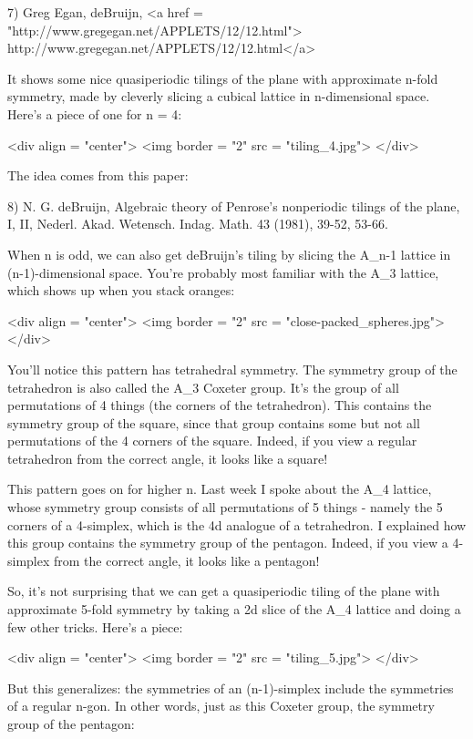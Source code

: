 7) Greg Egan, deBruijn, 
<a href = "http://www.gregegan.net/APPLETS/12/12.html">
http://www.gregegan.net/APPLETS/12/12.html</a>

It shows some nice quasiperiodic tilings of the plane with approximate 
n-fold symmetry, made by cleverly slicing a cubical lattice in 
n-dimensional space.   Here's a piece of one for n = 4:

<div align = "center">
<img border = "2" src = "tiling_4.jpg">
</div>
 
The idea comes from this paper:

8) N. G. deBruijn, Algebraic theory of Penrose's nonperiodic tilings 
of the plane, I, II, Nederl. Akad. Wetensch. Indag. Math. 43 (1981),
39-52, 53-66. 

When n is odd, we can also get deBruijn's tiling by slicing the
A_{n-1} lattice in (n-1)-dimensional space.  You're probably
most familiar with the A_{3} lattice, which shows up when you
stack oranges:

<div align = "center">
<img border = "2" src = "close-packed_spheres.jpg">
</div>

You'll notice this pattern has tetrahedral symmetry.  The symmetry
group of the tetrahedron is also called the A_{3} Coxeter
group.  It's the group of all permutations of 4 things (the corners of
the tetrahedron).  This contains the symmetry group of the square,
since that group contains some but not all permutations of the 4
corners of the square.  Indeed, if you view a regular tetrahedron from
the correct angle, it looks like a square!

This pattern goes on for higher n.  Last week I spoke about the
A_{4} lattice, whose symmetry group consists of all
permutations of 5 things - namely the 5 corners of a 4-simplex, which
is the 4d analogue of a tetrahedron.  I explained how this group
contains the symmetry group of the pentagon.  Indeed, if you view a
4-simplex from the correct angle, it looks like a pentagon!

So, it's not surprising that we can get a quasiperiodic tiling of the plane
with approximate 5-fold symmetry by taking a 2d slice of the
A_{4} lattice and doing a few other tricks.  Here's a piece:

<div align = "center">
<img border = "2" src = "tiling_5.jpg">
</div>
 
But this generalizes: 
the symmetries of an (n-1)-simplex include the symmetries of a regular 
n-gon.   In other words, just as this Coxeter group, the symmetry 
group of the pentagon:


